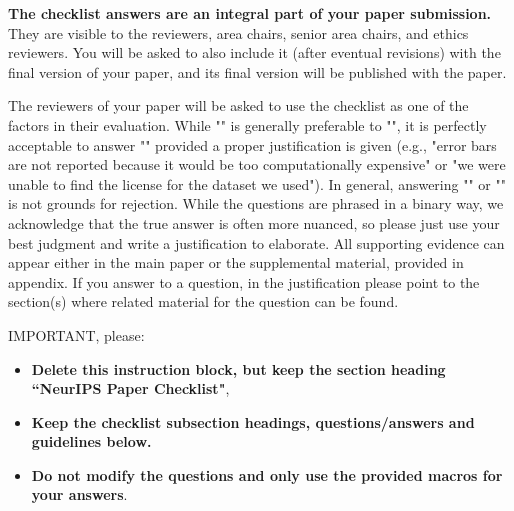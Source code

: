 \documentclass{article}
\begin{document}
{\bf The checklist answers are an integral part of your paper submission.} They are visible to the reviewers, area chairs, senior area chairs, and ethics reviewers. You will be asked to also include it (after eventual revisions) with the final version of your paper, and its final version will be published with the paper.

The reviewers of your paper will be asked to use the checklist as one of the factors in their evaluation. While "\answerYes{}" is generally preferable to "\answerNo{}", it is perfectly acceptable to answer "\answerNo{}" provided a proper justification is given (e.g., "error bars are not reported because it would be too computationally expensive" or "we were unable to find the license for the dataset we used"). In general, answering "\answerNo{}" or "\answerNA{}" is not grounds for rejection. While the questions are phrased in a binary way, we acknowledge that the true answer is often more nuanced, so please just use your best judgment and write a justification to elaborate. All supporting evidence can appear either in the main paper or the supplemental material, provided in appendix. If you answer \answerYes{} to a question, in the justification please point to the section(s) where related material for the question can be found.

IMPORTANT, please:
\begin{itemize}
    \item {\bf Delete this instruction block, but keep the section heading ``NeurIPS Paper Checklist"},
    \item  {\bf Keep the checklist subsection headings, questions/answers and guidelines below.}
    \item {\bf Do not modify the questions and only use the provided macros for your answers}.
\end{itemize}


\end{document}
